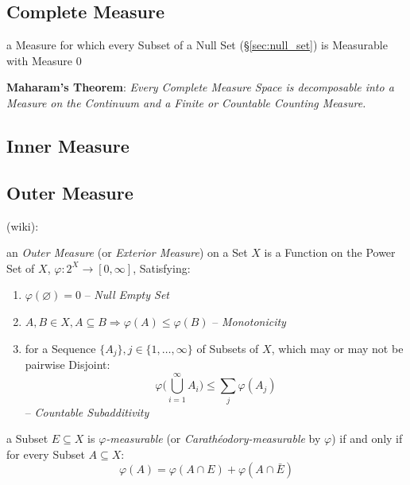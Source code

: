 \subsection{Complete Measure}\label{sec:complete_measure}

a Measure for which every Subset of a Null Set (\S\ref{sec:null_set}) is
Measurable with Measure $0$

\textbf{Maharam's Theorem}: \emph{
  Every Complete Measure Space is decomposable into a Measure on the Continuum
  and a Finite or Countable Counting Measure.
}



\subsection{Inner Measure}\label{sec:inner_measure}

\subsection{Outer Measure}\label{sec:outer_measure}

(wiki):

an \emph{Outer Measure} (or \emph{Exterior Measure}) on a Set $X$ is a Function
on the Power Set of $X$, $\varphi : 2^X \rightarrow [0, \infty]$, Satisfying:
\begin{enumerate}
  \item $\varphi(\varnothing) = 0$ -- \emph{Null Empty Set}
  \item $A,B \in X, A \subseteq B \Rightarrow \varphi(A) \leq \varphi(B)$ --
    \emph{Monotonicity}
  \item for a Sequence $\{A_j\}, j \in \{1, \ldots, \infty\}$ of Subsets of $X$,
    which may or may not be pairwise Disjoint:
    \[
      \varphi\Big(\bigcup_{i=1}^\infty A_i\Big) \leq \sum_j\varphi(A_j)
    \]
    -- \emph{Countable Subadditivity}
\end{enumerate}

a Subset $E \subseteq X$ is \emph{$\varphi$-measurable} (or
\emph{Carath\'eodory-measurable} by $\varphi$) if and only if for every Subset
$A \subseteq X$:
\[
  \varphi(A) = \varphi(A \cap E) + \varphi(A \cap \bar{E})
\]

